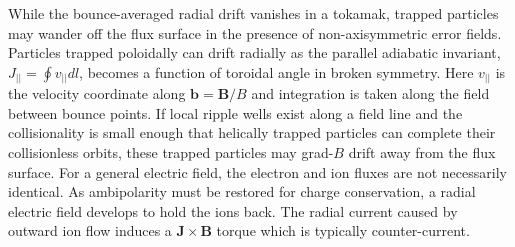 \documentclass[aip, pop, preprint]{revtex4-1}
\numberwithin{figure}{section}
\numberwithin{equation}{section}
\begin{document}
While  the bounce-averaged radial drift vanishes in a tokamak, trapped particles may wander off the flux surface in the presence of non-axisymmetric error fields. Particles trapped poloidally can drift radially as the parallel adiabatic invariant, $J_{||} = \oint v_{||} dl$, becomes a function of toroidal angle in broken symmetry. Here $v_{||}$ is the velocity coordinate along $\bm{b} = \bm{B}/B$ and integration is taken along the field between bounce points. If local ripple wells exist along a field line and the collisionality is small enough that helically trapped particles can complete their collisionless orbits, these trapped particles may grad-$B$ drift away from the flux surface.\cite{Stringer1972} For a general electric field, the electron and ion fluxes are not necessarily identical. As ambipolarity must be restored for charge conservation, a radial electric field develops to hold the ions back. The radial current caused by outward ion flow induces a $\bm{J} \times \bm{B}$ torque which is typically counter-current. 
\end{document}
